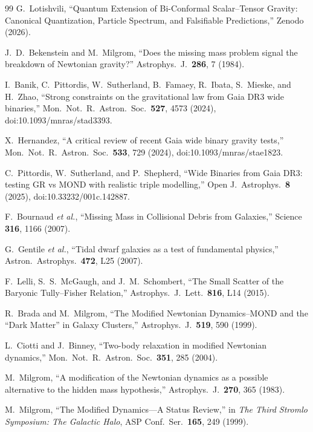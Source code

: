 \documentclass[11pt]{article}
\begin{document}
\begin{thebibliography}{99}
G.~Lotishvili,
``Quantum Extension of Bi-Conformal Scalar--Tensor Gravity:
Canonical Quantization, Particle Spectrum, and Falsifiable
Predictions,''
Zenodo (2026).

J.~D.~Bekenstein and M.~Milgrom,
``Does the missing mass problem signal the breakdown of Newtonian gravity?''
Astrophys.\ J.\ \textbf{286}, 7 (1984).

I.~Banik, C.~Pittordis, W.~Sutherland, B.~Famaey, R.~Ibata,
S.~Mieske, and H.~Zhao,
``Strong constraints on the gravitational law from Gaia DR3 wide binaries,''
Mon.\ Not.\ R.\ Astron.\ Soc.\ \textbf{527}, 4573 (2024),
doi:10.1093/mnras/stad3393.

X.~Hernandez,
``A critical review of recent Gaia wide binary gravity tests,''
Mon.\ Not.\ R.\ Astron.\ Soc.\ \textbf{533}, 729 (2024),
doi:10.1093/mnras/stae1823.

C.~Pittordis, W.~Sutherland, and P.~Shepherd,
``Wide Binaries from Gaia DR3: testing GR vs MOND with realistic triple modelling,''
Open J.\ Astrophys.\ \textbf{8} (2025),
doi:10.33232/001c.142887.

F.~Bournaud \textit{et al.},
``Missing Mass in Collisional Debris from Galaxies,''
Science \textbf{316}, 1166 (2007).

G.~Gentile \textit{et al.},
``Tidal dwarf galaxies as a test of fundamental physics,''
Astron.\ Astrophys.\ \textbf{472}, L25 (2007).

F.~Lelli, S.~S.~McGaugh, and J.~M.~Schombert,
``The Small Scatter of the Baryonic Tully--Fisher Relation,''
Astrophys.\ J.\ Lett.\ \textbf{816}, L14 (2015).

R.~Brada and M.~Milgrom,
``The Modified Newtonian Dynamics--MOND and the ``Dark Matter'' in Galaxy Clusters,''
Astrophys.\ J.\ \textbf{519}, 590 (1999).

L.~Ciotti and J.~Binney,
``Two-body relaxation in modified Newtonian dynamics,''
Mon.\ Not.\ R.\ Astron.\ Soc.\ \textbf{351}, 285 (2004).

M.~Milgrom,
``A modification of the Newtonian dynamics as a possible alternative to the hidden mass hypothesis,''
Astrophys.\ J.\ \textbf{270}, 365 (1983).

M.~Milgrom,
``The Modified Dynamics---A Status Review,''
in \textit{The Third Stromlo Symposium: The Galactic Halo},
ASP Conf.\ Ser.\ \textbf{165}, 249 (1999).


\end{thebibliography}
\end{document}
